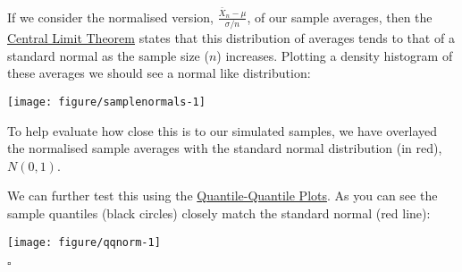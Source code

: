 \documentclass[legalpaper]{article}
\begin{document}
If we consider the normalised version,
\(\frac {\bar X_n - \mu} {\sigma / n}\), of our sample averages, then
the \href{https://en.wikipedia.org/wiki/Central_limit_theorem}{Central
Limit Theorem} states that this distribution of averages tends to that
of a standard normal as the sample size (\(n\)) increases. Plotting a
density histogram of these averages we should see a normal like
distribution:

\begin{center}\texttt{[image: figure/samplenormals-1]} \end{center}

To help evaluate how close this is to our simulated samples, we have
overlayed the normalised sample averages with the standard normal
distribution (in red), \(N(0,1)\).

We can further test this using the
\href{https://stat.ethz.ch/R-manual/R-devel/library/stats/html/qqnorm.html}{Quantile-Quantile
Plots}. As you can see the sample quantiles (black circles) closely
match the standard normal (red line):

\begin{center}\texttt{[image: figure/qqnorm-1]} \end{center}

\(\square\)
\end{document}
